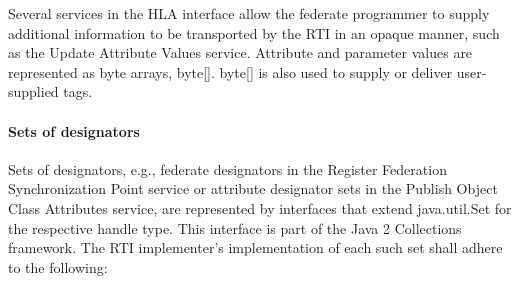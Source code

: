 \begin{compactstdpage}
    Several services in the HLA interface allow the federate programmer to supply additional information to be transported by the RTI in an opaque manner, such as the Update Attribute Values service. Attribute and parameter values are represented as byte arrays, byte[]. byte[] is also used to supply or deliver user-supplied tags.

    \paragraph{Sets of designators}

    Sets of designators, e.g., federate designators in the Register Federation Synchronization Point service or attribute designator sets in the Publish Object Class Attributes service, are represented by interfaces that extend java.util.Set for the respective handle type. This interface is part of the Java 2 Collections framework. The RTI implementer's implementation of each such set shall adhere to the following:

\end{compactstdpage}

\clearpage

